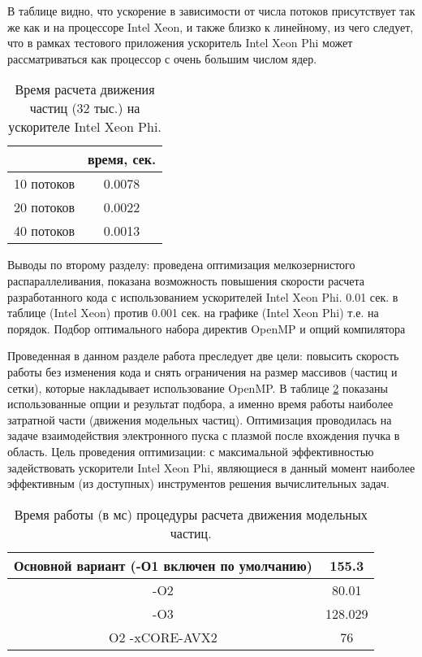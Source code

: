 В таблице видно, что ускорение в зависимости от числа потоков присутствует так же как и на процессоре Intel Xeon, и также близко к линейному, из чего следует, что в рамках тестового приложения ускоритель Intel Xeon Phi может рассматриваться как процессор с очень большим числом ядер.


\begin{table} [htbp]
	\centering
	\changecaptionwidth\captionwidth{15cm}
	\caption{Время расчета движения частиц (32 тыс.) на ускорителе Intel Xeon Phi.}
	\label{tabXeonPhi}%
	\begin{tabular}{| c | c |}
		\hline
		            & время, сек.  \\ \hline
		10 потоков  & 0.0078    \\ \hline
		20 потоков  & 0.0022      \\ \hline
		40 потоков  & 0.0013        \\ \hline
	\end{tabular}
\end{table}


Выводы по второму разделу: проведена оптимизация мелкозернистого распараллеливания, показана возможность повышения скорости расчета разработанного кода с использованием ускорителей Intel Xeon Phi. 0.01 сек. в таблице (Intel Xeon) против 0.001 сек. на графике (Intel Xeon Phi) т.е. на порядок.
Подбор оптимального набора директив OpenMP и опций компилятора

Проведенная в данном разделе работа преследует две цели: повысить скорость работы без изменения кода и снять ограничения на размер массивов (частиц и сетки), которые накладывает использование OpenMP. В таблице \ref{tabOMPoptions} показаны использованные опции и результат подбора, а именно время работы наиболее затратной части (движения модельных частиц).  Оптимизация проводилась на задаче взаимодействия электронного пуска с плазмой после вхождения пучка в область. Цель проведения оптимизации: с максимальной эффективностью задействовать ускорители Intel Xeon Phi, являющиеся в данный момент наиболее эффективным (из доступных) инструментов решения вычислительных задач.

\begin{table} [htbp]
	\centering
	\changecaptionwidth\captionwidth{15cm}
	\caption{Время работы (в мс) процедуры расчета движения модельных частиц.}\label{tabOMPoptions}%
	\begin{tabular}{| c | c |}
		\hline
	
		Основной вариант (-О1 включен по умолчанию)   &  155.3 \\ \hline
		-O2 &  80.01   \\ \hline
		-O3 &  128.029   \\ \hline
		O2 -xCORE-AVX2 & 76 \\ 
		\hline
	\end{tabular}
\end{table}


